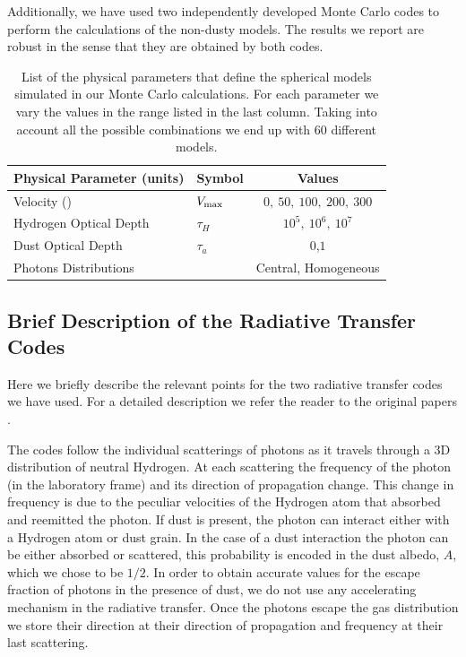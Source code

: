 \documentclass{emulateapj}
\newcommand{\ly}{{\ifmmode{{\rm Ly}\alpha~}\else{Ly$\alpha$~}\fi}}
\newcommand{\kms}{{\ifmmode{{\mathrm{\,km\ s}^{-1}}}\else{\,km~s$^{-1}$}\fi}}
\begin{document}
Additionally, we have used two independently developed Monte Carlo
codes \cite{CLARA,DijkstraKramer} to perform the calculations of the
non-dusty models. The results we report are robust in the sense
that they are obtained by both codes. 

\begin{table}
\begin{center}
\begin{tabular}{llc}\hline\hline
Physical Parameter (units) & Symbol & Values\\\hline
Velocity (\kms) & $V_{\rm max}$&$0,\ 50,\ 100,\ 200,\ 300$\\
Hydrogen Optical Depth & $\tau_{H} $ & $10^{5},\ 10^{6},\ 10^{7}$\\
Dust Optical Depth & $\tau_{a}$ & $0$,$1$\\
Photons Distributions & & Central, Homogeneous\\\hline\hline
\end{tabular}
\caption{
  List of the physical parameters that define the spherical models 
  simulated in our Monte Carlo calculations. For each parameter we
  vary the values in the range listed in the last column. Taking into
  account all the possible combinations we end up with $60$ different
  models.} 
\label{table:models}
\end{center}
\end{table}

\subsection{Brief Description of the Radiative Transfer Codes}

Here we briefly describe the relevant points for the two radiative
transfer codes we have used. For a detailed description we refer the
reader to the original papers \cite{CLARA,DijkstraKramer}.

The codes follow the individual scatterings of \ly photons as it
travels through a 3D distribution of neutral Hydrogen. At each
scattering the frequency of the photon (in the laboratory frame) and
its direction of propagation change. This change in frequency is due
to the peculiar velocities of the Hydrogen atom that absorbed and
reemitted the photon. If dust is present, the photon can interact
either with a Hydrogen atom or dust grain. In the case of a dust
interaction the photon can be either absorbed or scattered, this
probability is encoded in the dust albedo, $A$, which we chose to be
$1/2$. In order to obtain accurate values for the escape fraction of
photons in the presence of dust, we do not use any accelerating
mechanism in the radiative transfer.  Once the photons escape the gas
distribution we store their direction at their direction of
propagation and frequency at their last scattering.
\end{document}
